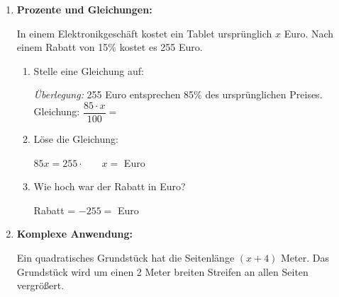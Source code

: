 \begin{enumerate}[label=\arabic*., resume]
\begin{enumerate}[label=\alph*)]
    \end{enumerate}

    \vspace{1cm}

    \item \textbf{Prozente und Gleichungen:}

    In einem Elektronikgeschäft kostet ein Tablet ursprünglich $x$ Euro. Nach einem Rabatt von 15\% kostet es 255 Euro.

    \vspace{0.5cm}

    \begin{enumerate}[label=\alph*)]
        \item Stelle eine Gleichung auf:

        \vspace{0.3cm}
        \textit{Überlegung:} 255 Euro entsprechen 85\% des ursprünglichen Preises.
        \vspace{0.3cm}
        Gleichung: $\dfrac{85 \cdot x}{100} = $ \underline{\hspace{2cm}}

        \vspace{0.5cm}

        \item Löse die Gleichung:

        \vspace{0.3cm}
        $85x = 255 \cdot \phantom{000}$
        \vspace{0.3cm}
        $x = $ \underline{\hspace{2cm}} Euro

        \vspace{0.5cm}

        \item Wie hoch war der Rabatt in Euro?

        \vspace{0.3cm}
        Rabatt = \underline{\hspace{2cm}} $- 255 = $ \underline{\hspace{2cm}} Euro

    \end{enumerate}

    \vspace{1cm}

    \item \textbf{Komplexe Anwendung:}

    Ein quadratisches Grundstück hat die Seitenlänge $(x + 4)$ Meter. Das Grundstück wird um einen 2 Meter breiten Streifen an allen Seiten vergrößert.


\end{enumerate}
